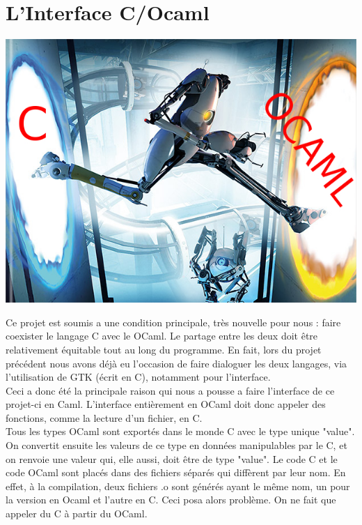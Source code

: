 \documentclass[12pt,a4paper]{report}
\begin{document}
\chapter{L'Interface C/Ocaml}

\begin{center}
\includegraphics[scale=0.5]{COcaml.jpg}
\end{center}

Ce projet est soumis a une condition principale, très nouvelle pour nous : faire coexister le langage C avec le OCaml. Le partage entre les deux doit être relativement équitable tout au long du programme. En fait, lors du projet précédent nous avons déjà eu l'occasion de faire dialoguer les deux langages, via l'utilisation de GTK (écrit en C), notamment pour l'interface.\\

Ceci a donc été la principale raison qui nous a pousse a faire l'interface de ce projet-ci en Caml. L'interface entièrement en OCaml doit donc appeler des fonctions, comme la lecture d'un fichier, en C.\\

Tous les types OCaml sont exportés dans le monde C avec le type unique "value". On convertit ensuite les valeurs de ce type en données manipulables par le C, et on renvoie une valeur qui, elle aussi, doit être de type "value". Le code C et le code OCaml sont placés dans des fichiers séparés qui diffèrent par leur nom. En effet, à la compilation, deux fichiers .o sont générés ayant le même nom, un pour la version en Ocaml et l'autre en C. Ceci posa alors problème. On ne fait que appeler du C à partir du OCaml.\\
\end{document}
